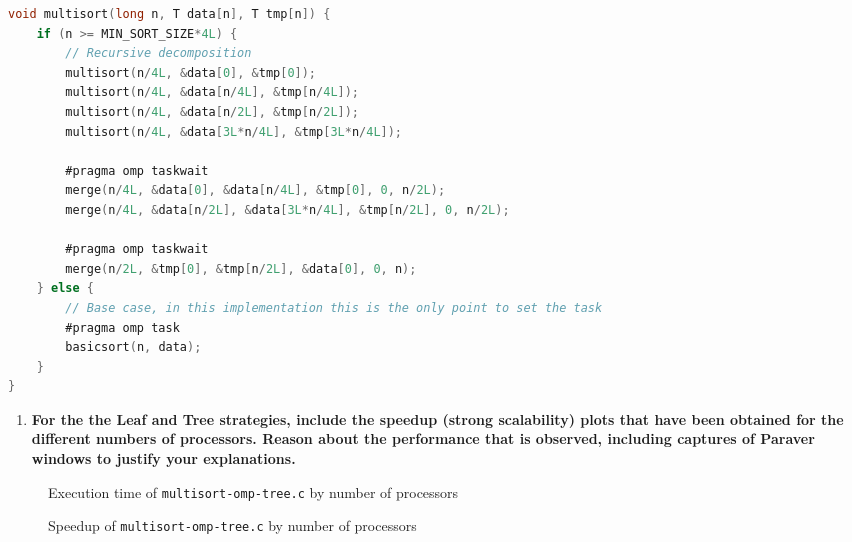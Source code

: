 \documentclass[a4paper]{article}
\newenvironment{questionenum}{%
\setlist[enumerate]{resume}
\restartlist{enumerate}
\newcommand{\question}[1]{
\begin{enumerate}
	\item\bfseries ##1
\end{enumerate}
}}{%
}
\begin{document}
\begin{questionenum}
\begin{lstlisting}[language=C, title=\texttt{multisort-omp-leaf.c}]
void multisort(long n, T data[n], T tmp[n]) {
    if (n >= MIN_SORT_SIZE*4L) {
        // Recursive decomposition
        multisort(n/4L, &data[0], &tmp[0]);
        multisort(n/4L, &data[n/4L], &tmp[n/4L]);
        multisort(n/4L, &data[n/2L], &tmp[n/2L]);
        multisort(n/4L, &data[3L*n/4L], &tmp[3L*n/4L]);
        
        #pragma omp taskwait
        merge(n/4L, &data[0], &data[n/4L], &tmp[0], 0, n/2L);
        merge(n/4L, &data[n/2L], &data[3L*n/4L], &tmp[n/2L], 0, n/2L);
        
        #pragma omp taskwait
        merge(n/2L, &tmp[0], &tmp[n/2L], &data[0], 0, n);
    } else {
        // Base case, in this implementation this is the only point to set the task
        #pragma omp task
        basicsort(n, data);
    }
}
    \end{lstlisting}
    
    \question{For the the Leaf and Tree strategies, include the speedup (strong scalability) plots that have been obtained for the different numbers of processors. Reason about the performance that is observed, including captures of Paraver windows to justify your explanations.}
    
    \begin{figure}[H]
        \centering
        \begin{minipage}[t]{0.49\textwidth}
            \caption{Execution time of \texttt{multisort-omp-tree.c} by number of processors}
            \label{fig:tree_time}
        \end{minipage}
        \hfill
        \begin{minipage}[t]{0.49\textwidth}
            \caption{Speedup of \texttt{multisort-omp-tree.c} by number of processors}
            \label{fig:tree_speedup}
        \end{minipage}
    \end{figure}



\end{questionenum}
\end{document}

